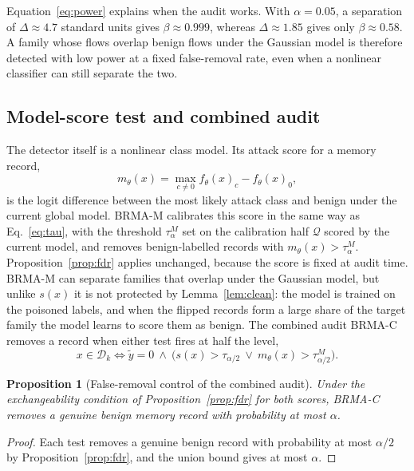 \documentclass[pdflatex,sn-mathphys-num]{sn-jnl}
\theoremstyle{thmstyleone}
\newtheorem{proposition}{Proposition}
\theoremstyle{thmstylethree}
\begin{document}
Equation~\eqref{eq:power} explains when the audit works. With $\alpha=0.05$, a separation of $\Delta\approx4.7$ standard units gives $\beta\approx0.999$, whereas $\Delta\approx1.85$ gives only $\beta\approx0.58$. A family whose flows overlap benign flows under the Gaussian model is therefore detected with low power at a fixed false-removal rate, even when a nonlinear classifier can still separate the two.

\subsection{Model-score test and combined audit}\label{sec:variants}
The detector itself is a nonlinear class model. Its attack score for a memory record,
\begin{equation}
m_\theta(x)=\max_{c\neq 0} f_\theta(x)_c-f_\theta(x)_0 ,
\label{eq:margin}
\end{equation}
is the logit difference between the most likely attack class and benign under the current global model. BRMA-M calibrates this score in the same way as Eq.~\eqref{eq:tau}, with the threshold $\tau^{M}_\alpha$ set on the calibration half $\mathcal{Q}$ scored by the current model, and removes benign-labelled records with $m_\theta(x)>\tau^{M}_\alpha$. Proposition~\ref{prop:fdr} applies unchanged, because the score is fixed at audit time. BRMA-M can separate families that overlap under the Gaussian model, but unlike $s(x)$ it is not protected by Lemma~\ref{lem:clean}: the model is trained on the poisoned labels, and when the flipped records form a large share of the target family the model learns to score them as benign. The combined audit BRMA-C removes a record when either test fires at half the level,
\begin{equation}
x\in\mathcal{D}_k \Leftrightarrow \tilde y=0 \ \wedge\ \big(s(x)>\tau_{\alpha/2}\ \vee\ m_\theta(x)>\tau^{M}_{\alpha/2}\big).
\label{eq:combined}
\end{equation}

\begin{proposition}[False-removal control of the combined audit]\label{prop:union}
Under the exchangeability condition of Proposition~\ref{prop:fdr} for both scores, BRMA-C removes a genuine benign memory record with probability at most $\alpha$.
\end{proposition}
\begin{proof}
Each test removes a genuine benign record with probability at most $\alpha/2$ by Proposition~\ref{prop:fdr}, and the union bound gives at most $\alpha$.
\end{proof}
\end{document}
